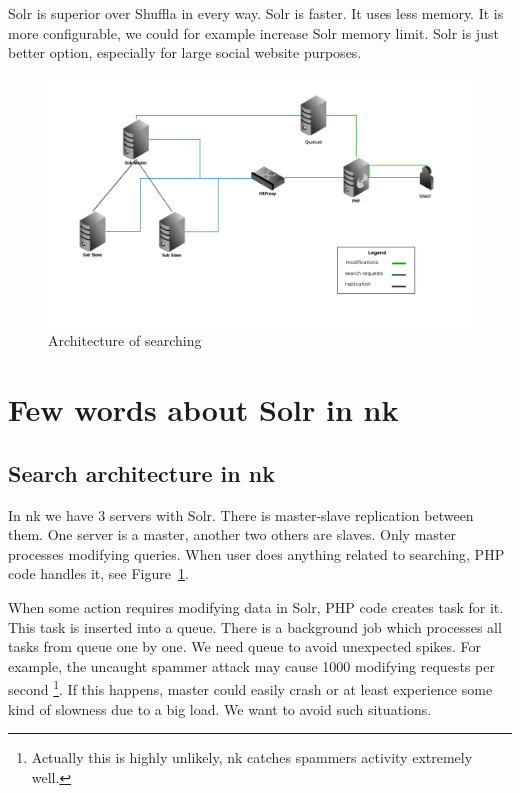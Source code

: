 \documentclass[10pt,a4paper]{article}
\begin{document}
Solr is superior over Shuffla in every way. Solr is faster. It uses less memory. It is more configurable, we could for example increase Solr memory limit. Solr is just better option, especially for large social website purposes. 

\begin{figure}[b!]
\centering
  \includegraphics[width=12cm]{architektura_wyszukiwania}
  \caption{Architecture of searching}
  \label{fig:arch}
\end{figure}

\section{Few words about Solr in nk}
\label{chapter:nk}

\subsection{Search architecture in nk}

In nk we have 3 servers with Solr. There is master-slave replication between them. One server is a master, another two others are slaves. Only master processes modifying queries. When user does anything related to searching, PHP code handles it, see Figure~\ref{fig:arch}.

When some action requires modifying data in Solr, PHP code creates task for it. This task is inserted into a queue. There is a background job which processes all tasks from queue one by one. We need queue to avoid unexpected spikes. For example, the uncaught spammer attack may cause 1000 modifying requests per second \footnote{Actually this is highly unlikely, nk catches spammers activity extremely well.}. If this happens, master could easily crash or at least experience some kind of slowness due to a big load. We want to avoid such situations. 
\end{document}

